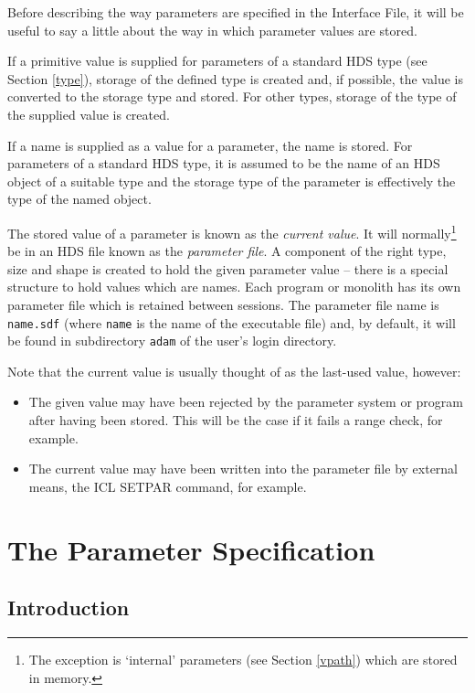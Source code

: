 \documentclass[twoside,11pt]{article}
\newcommand{\xlabel}[1]{}
\renewcommand{\_}{\texttt{\symbol{95}}}
\begin{document}
Before describing the way parameters are specified in the Interface File, it 
will be useful to say a little about the way in which parameter values are 
stored.

If a primitive value is supplied for parameters of a standard HDS type
(see Section \ref{type}),
storage of the defined type is created and, if possible, the value is 
converted to the storage type and stored.
For other types, storage of the type of the supplied value is created.

If a name is supplied as a value for a parameter, the name is stored.
For parameters of a standard HDS type, it is assumed to be the name of an HDS 
object of a suitable type and the storage type of the parameter is effectively
the type of the named object.

The stored value of a parameter is known as the {\em current value}. It will
normally\footnote{The exception is `internal' parameters (see Section 
\ref{vpath}) which are stored in memory.} be in an HDS file known as the 
{\em parameter file}.
A component of the right type, size and shape is created to hold the given 
parameter value -- there is a special structure to hold values which are names.
Each program or monolith has its own parameter file which is retained between 
sessions. The parameter file name is \texttt{name.sdf} (where \texttt{name} is the
name of the executable file) and, by default, it will be found in subdirectory
\texttt{adam} of the user's login directory.

Note that the current value is usually thought of as the last-used value, 
however:
\begin{itemize}
\item The given value may have been rejected by the parameter system or program
after having been stored. This will be the case if it fails a range check, for
example.
\item The current value may have been written into the parameter file by
external means, the ICL SETPAR command, for example.
\end{itemize}

\section{The Parameter Specification\xlabel{the_parameter_specification}}

\subsection{Introduction\xlabel{introduction2}}
\end{document}
